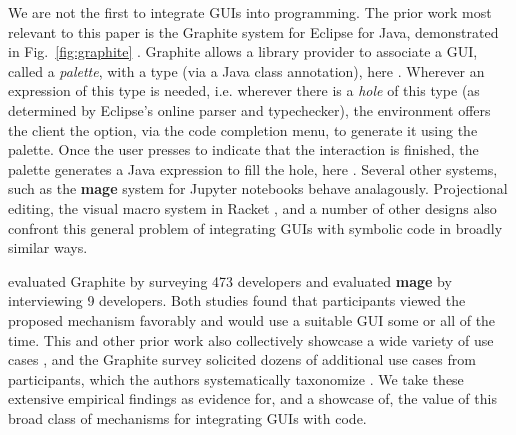 We are not the first to integrate GUIs 
into programming.
The prior work most relevant to this paper is the {Graphite} system for Eclipse for Java,
demonstrated in Fig.~\ref{fig:graphite} \cite{Graphite}.
Graphite allows a library provider to associate a GUI, called a \emph{palette}, with a type 
(via a Java class annotation), here .
Wherever an expression of this type is needed,
i.e. wherever there is a \emph{hole} of this type 
(as determined by Eclipse's online parser and typechecker),
the environment offers the client the option, via the code completion menu,
to generate it using the palette.
Once the user presses  to indicate that the 
interaction is finished, the palette generates a
Java expression to fill the hole, here .
Several other systems, such as the  
\textbf{mage} system for Jupyter notebooks \cite{DBLP:conf/uist/KeryRHMWP20}
behave analagously.
Projectional editing, the visual macro system in Racket \cite{interactive-visual-syntax}, and a number of other designs
also confront this general problem of integrating GUIs with symbolic code
in broadly similar ways.

\citet{Graphite} evaluated Graphite by surveying 473 developers 
and \citet{DBLP:conf/uist/KeryRHMWP20} evaluated \textbf{mage} by interviewing 9 developers.
Both studies found that
participants viewed the proposed mechanism favorably and 
would use a suitable GUI some or all of the time.
This and other prior work also collectively showcase a wide variety of use cases \cite{Graphite,DBLP:conf/uist/KeryRHMWP20,interactive-visual-syntax}, 
and the Graphite survey solicited dozens of additional use cases from participants,
which the authors systematically taxonomize \cite{Graphite}. 
We take these extensive empirical findings   
as evidence for, and a showcase of, 
the value of this broad class of mechanisms for integrating GUIs with code.
\vspace{-1mm}

